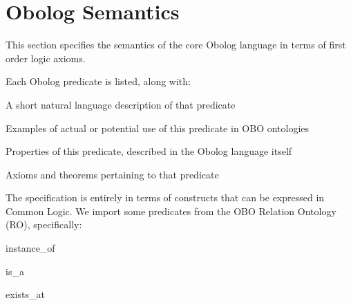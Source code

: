 \section{Obolog Semantics}

This section specifies the semantics of the core Obolog language in terms of first order logic axioms.

Each Obolog predicate is listed, along with:

\begin{clist}
\item A short natural language description of that predicate
\item Examples of actual or potential use of this predicate in OBO ontologies
\item Properties of this predicate, described in the Obolog language itself
\item Axioms and theorems pertaining to that predicate
\end{clist}

The specification is entirely in terms of constructs that can be
expressed in Common Logic. We import some predicates from the OBO
Relation Ontology (RO), specifically:

\begin{clist}
\item instance\_of
\item is\_a
\item exists\_at
\end{clist}





